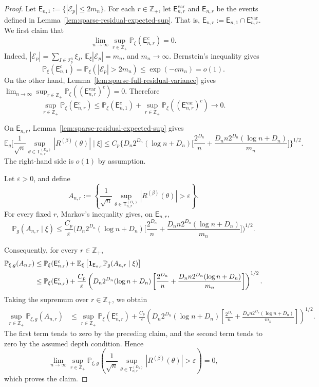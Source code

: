 \documentclass[12pt]{article}
\newcommand{\E}{\mathbb{E}}
\renewcommand{\P}{\mathbb{P}}
\newcommand{\indicator}{{\bf{1}}}
\newcommand{\mcE}{\mathcal{E}}
\newcommand{\mcI}{\mathcal{I}}
\begin{document}
\begin{proof}
Let $\mathsf E_{n,1}:=\{|\mcE_p|\le 2m_n\}$. For each \(r\in\mathbb Z_+\), let \(\mathsf E_{n,r}^{\mathrm{var}}\) and
\(\mathsf E_{n,r}\) be the events defined in
Lemma~\ref{lem:sparse-residual-expected-sup}. That is, $\mathsf E_{n,r}
    :=
    \mathsf E_{n,1}\cap \mathsf E_{n,r}^{\mathrm{var}}$. We first claim that
\[
\lim_{n\to\infty}
\sup_{r\in\mathbb Z_+}
\P_\xi(\mathsf E_{n,r}^c)
=0.
\]
Indeed, \(|\mcE_p|=\sum_{I\in\mcI_p^n}\xi_I\),
\(\E_\xi|\mcE_p|=m_n\), and \(m_n\to\infty\). Bernstein's inequality gives
\[
\P_\xi(\mathsf E_{n,1}^c)
=
\P_\xi(|\mcE_p|>2m_n)
\le
\exp(-c m_n)
=
o(1).
\]
On the other hand, Lemma~\ref{lem:sparse-full-residual-variance} gives
$\lim_{n\to\infty}
\sup_{r\in\mathbb Z_+}
\P_\xi\left((\mathsf E_{n,r}^{\mathrm{var}})^c\right)
=0$. Therefore
\[
\sup_{r\in\mathbb Z_+}
\P_\xi(\mathsf E_{n,r}^c)
\le
\P_\xi(\mathsf E_{n,1}^c)
+
\sup_{r\in\mathbb Z_+}
\P_\xi\left((\mathsf E_{n,r}^{\mathrm{var}})^c\right)
\to0.
\]

On \(\mathsf E_{n,r}\), Lemma~\ref{lem:sparse-residual-expected-sup} gives
\[
\E_g
\bigg[
\frac1{\sqrt n}
\sup_{\theta\in\mathsf{T}_{n,r}^{(D_n)}}
|R^{(\beta)}(\theta)|
\mid \xi
\bigg]
\le
C_p
\bigg\{
D_n2^{D_n}(\log n+D_n)
\bigg[
\frac{2^{D_n}}{n}
+
\frac{D_n n 2^{D_n}(\log n+D_n)}{m_n}
\bigg]
\bigg\}^{1/2}.
\]
The right-hand side is \(o(1)\) by assumption.

Let \(\varepsilon>0\), and define
\[
A_{n,r}
:=
\left\{
\frac1{\sqrt n}
\sup_{\theta\in\mathsf{T}_{n,r}^{(D_n)}}
|R^{(\beta)}(\theta)|
>
\varepsilon
\right\}.
\]
For every fixed \(r\), Markov's inequality gives, on \(\mathsf E_{n,r}\),
\[
\P_g(A_{n,r}\mid \xi)
\le
\frac{C_p}{\varepsilon}
\bigg(
D_n2^{D_n}(\log n+D_n)
\bigg[
\frac{2^{D_n}}{n}
+
\frac{D_n n 2^{D_n}(\log n+D_n)}{m_n}
\bigg]
\bigg)^{1/2}.
\]

Consequently, for every \(r\in\mathbb Z_+\),
\[
\begin{aligned}
\P_{\xi,g}(A_{n,r})
&\le
\P_\xi(\mathsf E_{n,r}^c)
+
\E_\xi\left[
\indicator_{\mathsf E_{n,r}}
\P_g(A_{n,r}\mid \xi)
\right]  \\
&\le
\P_\xi(\mathsf E_{n,r}^c)
+
\frac{C_p}{\varepsilon}
\left(
D_n 2^{D_n}(\log n+D_n)
\left[
\frac{2^{D_n}}{n}
+
\frac{D_n n2^{D_n}(\log n+D_n)}{m_n}
\right]
\right)^{1/2}.
\end{aligned}
\]
Taking the supremum over \(r\in\mathbb Z_+\), we obtain
\[
\begin{aligned}
\sup_{r\in\mathbb Z_+}\P_{\xi,g}(A_{n,r})
&\le
\sup_{r\in\mathbb Z_+}\P_\xi(\mathsf E_{n,r}^c)
+
\frac{C_p}{\varepsilon}
\left(
D_n 2^{D_n}(\log n+D_n)
\left[
\frac{2^{D_n}}{n}
+
\frac{D_n n2^{D_n}(\log n+D_n)}{m_n}
\right]
\right)^{1/2}.
\end{aligned}
\]
The first term tends to zero by the preceding claim, and the second term tends
to zero by the assumed depth condition. Hence
\[
\lim_{n\to\infty}
\sup_{r\in\mathbb Z_+}
\P_{\xi,g}\left(
\frac1{\sqrt n}
\sup_{\theta\in\mathsf{T}_{n,r}^{(D_n)}}
|R^{(\beta)}(\theta)|
>
\varepsilon
\right)
=0,
\]
which proves the claim.
\end{proof}
\end{document}
